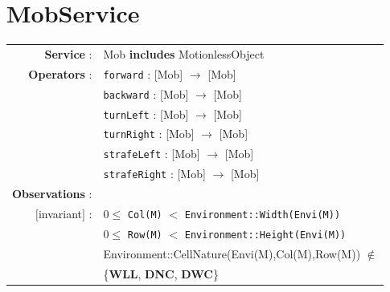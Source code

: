 \documentclass[12pt]{report}
\begin{document}
\section{MobService}

\begin{tabular}{rl}

\textbf{Service} : & Mob \textbf{includes} MotionlessObject \\

\textbf{Operators} : & \texttt{forward} : \textrm{[Mob]} $\rightarrow$ \textrm{[Mob]} \\
& \texttt{backward} : \textrm{[Mob]} $\rightarrow$ \textrm{[Mob]} \\
& \texttt{turnLeft} : \textrm{[Mob]} $\rightarrow$ \textrm{[Mob]} \\
& \texttt{turnRight} : \textrm{[Mob]} $\rightarrow$ \textrm{[Mob]} \\
& \texttt{strafeLeft} : \textrm{[Mob]} $\rightarrow$ \textrm{[Mob]} \\
& \texttt{strafeRight} : \textrm{[Mob]} $\rightarrow$ \textrm{[Mob]} \\

\textbf{Observations} : \\
$[$invariant$]$ : & $0 \leq$ \texttt{Col(M)} $<$ \texttt{Environment::Width(Envi(M))} \\
& $0 \leq$ \texttt{Row(M)} $<$ \texttt{Environment::Height(Envi(M))} \\
& Environment::CellNature(Envi(M),Col(M),Row(M)) $\notin$ \\
& \{\textbf{WLL}, \textbf{DNC},  \textbf{DWC}\} \\


\end{tabular}
\end{document}
